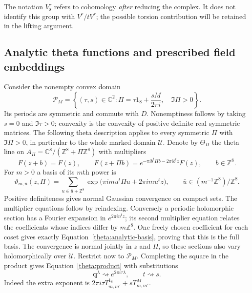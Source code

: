 \documentclass[11pt]{article}
\theoremstyle{definition}
\theoremstyle{remark}
\newcommand{\C}{\mathbb C}
\newcommand{\Z}{\mathbb Z}
\newcommand{\qnov}{\mathbf q}
\numberwithin{equation}{section}
\begin{document}
The notation $V_{\mathrm s}^r$ refers to cohomology \emph{after} reducing the
complex.  It does not identify this group with $V^r/tV^r$; the possible
torsion contribution will be retained in the lifting argument.

\subsection{Analytic theta functions and prescribed field embeddings}

Consider the nonempty convex domain
\begin{equation}\label{theta:period-domain}
 \mathcal P_M=
 \left\{(\tau,s)\in\C^2:
    \Pi=\tau1_8+\frac{sM}{2\pi i},\quad\Im\Pi>0\right\}.
\end{equation}
Its periods are symmetric and commute with $D$.  Nonemptiness follows
by taking $s=0$ and $\Im\tau>0$; convexity is the convexity of positive
definite real symmetric matrices.  The following theta description applies
to every symmetric $\Pi$ with $\Im\Pi>0$, in particular to the whole
marked domain $\mathcal U$.  Denote by $\Theta_\Pi$ the theta line
on $A_\Pi=\C^8/(\Z^8+\Pi\Z^8)$ with multipliers
\[
 F(z+b)=F(z),\qquad
 F(z+\Pi b)=e^{-\pi i b^t\Pi b-2\pi i b^tz}F(z),
 \qquad b\in\Z^8.
\]
For $m>0$ a basis of its $m$th power is
\begin{equation}\label{theta:analytic-basis}
 \vartheta_{m,\bar u}(z,\Pi)
 =\sum_{u\in\bar u+\Z^8}
       \exp\bigl(\pi i m u^t\Pi u+2\pi i m u^tz\bigr),
 \qquad \bar u\in(m^{-1}\Z^8)/\Z^8.
\end{equation}
Positive definiteness gives normal Gaussian convergence on compact sets.
The multiplier equations follow by reindexing.  Conversely a periodic
holomorphic section has a Fourier expansion in $e^{2\pi i n^tz}$; its
second multiplier equation relates the coefficients whose indices differ
by $m\Z^8$.  One freely chosen coefficient for each coset gives exactly
Equation~\eqref{theta:analytic-basis}, proving that this is the full basis.
The convergence is normal jointly in $z$ and $\Pi$, so these sections
also vary holomorphically over $\mathcal U$.
Restrict now to $\mathcal P_M$.  Completing the square in the product gives
Equation~\eqref{theta:product} with substitutions
\begin{equation}\label{theta:analytic-substitution}
 \qnov^\lambda\rightsquigarrow e^{2\pi i\tau\lambda},
 \qquad t\rightsquigarrow s.
\end{equation}
Indeed the extra exponent is
$2\pi i\tau T^{1_8}_{m,m'}+sT^M_{m,m'}$.
\end{document}
